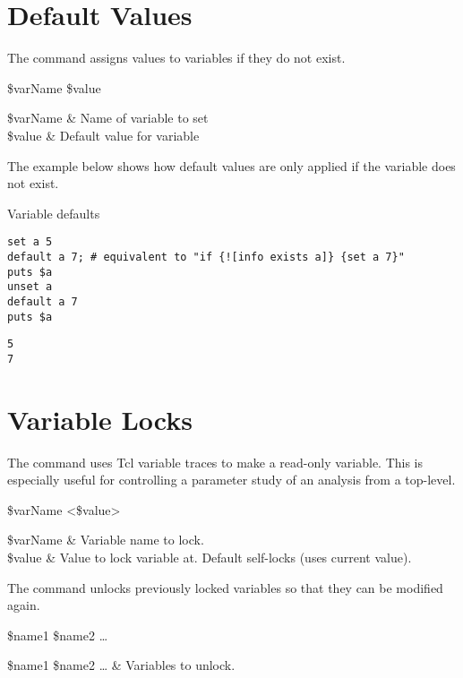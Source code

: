 \documentclass{article}
\begin{document}
\clearpage

\section{Default Values}
The command  assigns values to variables if they do not exist. 

\begin{syntax}
 \$varName \$value
\end{syntax}
\begin{args}
\$varName & Name of variable to set \\
\$value & Default value for variable
\end{args}

The example below shows how default values are only applied if the variable does not exist.

\begin{example}{Variable defaults}
\begin{lstlisting}
set a 5
default a 7; # equivalent to "if {![info exists a]} {set a 7}"
puts $a
unset a
default a 7
puts $a
\end{lstlisting}
\tcblower
\begin{lstlisting}
5
7
\end{lstlisting}
\end{example}
\clearpage
\section{Variable Locks}
The command  uses Tcl variable traces to make a read-only variable. 
This is especially useful for controlling a parameter study of an analysis from a top-level.

\begin{syntax}
 \$varName <\$value>
\end{syntax}
\begin{args}
\$varName & Variable name to lock. \\
\$value & Value to lock variable at. Default self-locks (uses current value).
\end{args}

The command  unlocks previously locked variables so that they can be modified again.

\begin{syntax}
 \$name1 \$name2 …
\end{syntax}
\begin{args}
\$name1 \$name2 … & Variables to unlock.
\end{args}
\end{document}
